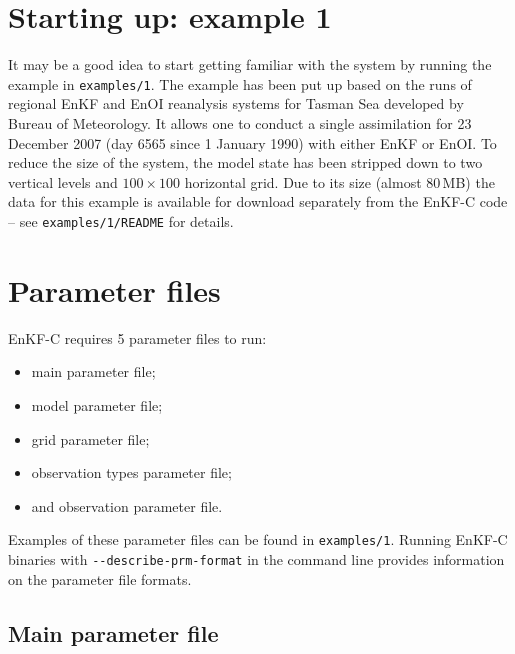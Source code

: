 \documentclass[11pt]{report}
\begin{document}
\section{Starting up: example 1}
\label{example1}

It may be a good idea to start getting familiar with the system by running the example in \verb|examples/1|.
The example has been put up based on the runs of regional EnKF and EnOI reanalysis systems for Tasman Sea developed by Bureau of Meteorology. 
It allows one to conduct a single assimilation for 23 December 2007 (day 6565 since 1 January 1990) with either EnKF or EnOI.
To reduce the size of the system, the model state has been stripped down to two vertical levels and $100 \times 100$ horizontal grid.
Due to its size (almost 80\,MB) the data for this example is available for download separately from the EnKF-C code -- see \verb|examples/1/README| for details.

\section{Parameter files}

EnKF-C requires 5 parameter files to run:
\begin{itemize} 
\item main parameter file;
\item model parameter file;
\item grid parameter file;
\item observation types parameter file;
\item and observation parameter file.
\end{itemize}
Examples of these parameter files can be found in \verb|examples/1|.
Running EnKF-C binaries with \verb|--describe-prm-format| in the command line provides information on the parameter file formats.

\subsection{Main parameter file}
\label{sec:mainprm}
\end{document}

